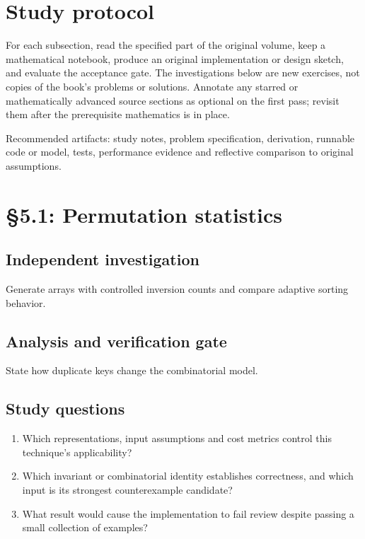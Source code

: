 \documentclass[11pt,letterpaper]{article}
\begin{document}
\tableofcontents
\clearpage
{}
\section{Study protocol}

For each subsection, read the specified part of the original volume, keep a mathematical notebook, produce an original implementation or design sketch, and evaluate the acceptance gate. The investigations below are new exercises, not copies of the book's problems or solutions. Annotate any starred or mathematically advanced source sections as optional on the first pass; revisit them after the prerequisite mathematics is in place.
\begin{evidencebox}Recommended artifacts: study notes, problem specification, derivation, runnable code or model, tests, performance evidence and reflective comparison to original assumptions.\end{evidencebox}

\section{\S 5.1: Permutation statistics}
\subsection{Independent investigation}
Generate arrays with controlled inversion counts and compare adaptive sorting behavior.
\subsection{Analysis and verification gate}
State how duplicate keys change the combinatorial model.
\subsection{Study questions}
\begin{enumerate}
\item Which representations, input assumptions and cost metrics control this technique's applicability?
\item Which invariant or combinatorial identity establishes correctness, and which input is its strongest counterexample candidate?
\item What result would cause the implementation to fail review despite passing a small collection of examples?
\end{enumerate}
\end{document}

